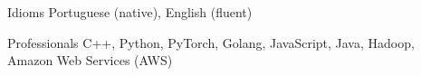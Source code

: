 
\begin{cvskills}
	\cvskill
	{Idioms}
	{Portuguese (native), English (fluent)}

	\cvskill
	{Professionals}
	{C++, Python, PyTorch, Golang, JavaScript, Java, Hadoop, Amazon Web Services (AWS)}

\end{cvskills}
